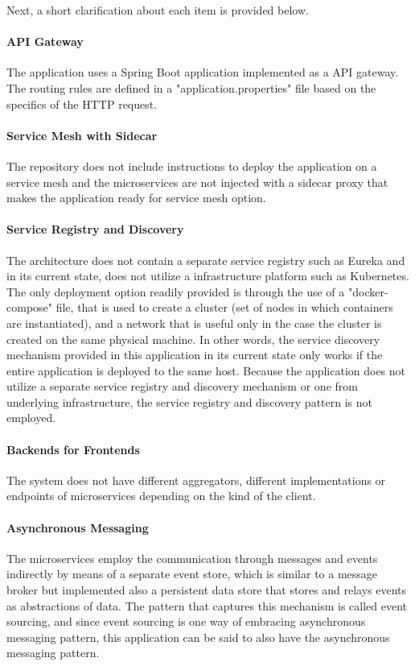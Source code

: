 \documentclass{Configuration_Files/PoliMi3i_thesis}
\begin{document}
Next, a short clarification about each item is provided below.

\paragraph{API Gateway} The application uses a Spring Boot application implemented as a API gateway.
The routing rules are defined in a "application.properties" file based on the specifics of the HTTP request.

\paragraph{Service Mesh with Sidecar} The repository does not include instructions to deploy the application on a service mesh and the microservices are not injected with a sidecar proxy that makes the application ready for service mesh option.

\paragraph{Service Registry and Discovery} The architecture does not contain a separate service registry such as Eureka and in its current state, does not utilize a infrastructure platform such as Kubernetes.
The only deployment option readily provided is through the use of a "docker-compose" file, that is used to create a cluster (set of nodes in which containers are instantiated), and a network that is useful only in the case the cluster is created on the same physical machine.
In other words, the service discovery mechanism provided in this application in its current state only works if the entire application is deployed to the same host.
Because the application does not utilize a separate service registry and discovery mechanism or one from underlying infrastructure, the service registry and discovery pattern is not employed.

\paragraph{Backends for Frontends} The system does not have different aggregators, different implementations or endpoints of microservices depending on the kind of the client.

\paragraph{Asynchronous Messaging} The microservices employ the communication through messages and events indirectly by means of a separate event store, which is similar to a message broker but implemented also a persistent data store that stores and relays events as abstractions of data.
The pattern that captures this mechanism is called event sourcing, and since event sourcing is one way of embracing asynchronous messaging pattern, this application can be said to also have the asynchronous messaging pattern.
\end{document}

